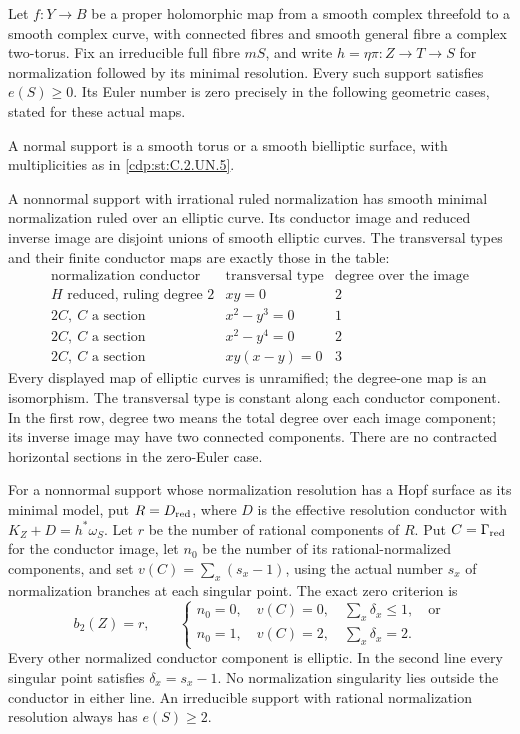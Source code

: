 
\begin{proposition}\label{cdp:st:C.2.UN.12}
Let $f:Y\to B$ be a proper holomorphic map from a smooth
complex threefold to a smooth complex curve, with connected
fibres and smooth general fibre a complex two-torus. Fix an
irreducible full fibre $mS$, and write
$h=\eta\pi:Z\to T\to S$ for normalization followed by its
minimal resolution. Every such support satisfies $e(S)\ge0$.
Its Euler number is zero precisely in the following geometric
cases, stated for these actual maps.

A normal support is a smooth torus or a smooth bielliptic
surface, with multiplicities as in \ref{cdp:st:C.2.UN.5}.

A nonnormal support with irrational ruled normalization has
smooth minimal normalization ruled over an elliptic curve.
Its conductor image and reduced inverse image are disjoint
unions of smooth elliptic curves. The transversal types and
their finite conductor maps are exactly those in the table:
\[
\begin{array}{c|c|c}
 \text{normalization conductor}&\text{transversal type}
       &\text{degree over the image}\\ \hline
 H\text{ reduced, ruling degree }2&xy=0&2\\
 2C,\ C\text{ a section}&x^2-y^3=0&1\\
 2C,\ C\text{ a section}&x^2-y^4=0&2\\
 2C,\ C\text{ a section}&xy(x-y)=0&3
\end{array}                                                   \tag{C.IZ.1}\label{cdp:eq:C.IZ.1}
\]
Every displayed map of elliptic curves is unramified; the
degree-one map is an isomorphism. The transversal type is
constant along each conductor component. In the first row,
degree two means the total degree over each image component;
its inverse image may have two connected components. There are no
contracted horizontal sections in the zero-Euler case.

For a nonnormal support whose normalization resolution
has a Hopf surface as its minimal model, put $R=D_{\rm red}$,
where $D$ is the effective
resolution conductor with $K_Z+D=h^*\omega_S$. Let $r$ be
the number of rational components of $R$. Put
$C=\Gamma_{\rm red}$ for the conductor image, let $n_0$ be
the number of its rational-normalized components, and set
$v(C)=\sum_x(s_x-1)$, using the actual number $s_x$ of
normalization branches at each singular point. The exact
zero criterion is
\[
 b_2(Z)=r,\qquad
 \begin{cases}
 n_0=0,\quad v(C)=0,\quad\sum_x\delta_x\le1,\quad\text{or}\\
 n_0=1,\quad v(C)=2,\quad\sum_x\delta_x=2.
 \end{cases}                                                   \tag{C.IZ.2}\label{cdp:eq:C.IZ.2}
\]
Every other normalized conductor component is elliptic.
In the second line every singular point satisfies
$\delta_x=s_x-1$. No normalization singularity lies outside
the conductor in either line. An irreducible support with
rational normalization resolution always has $e(S)\ge2$.


\end{proposition}
